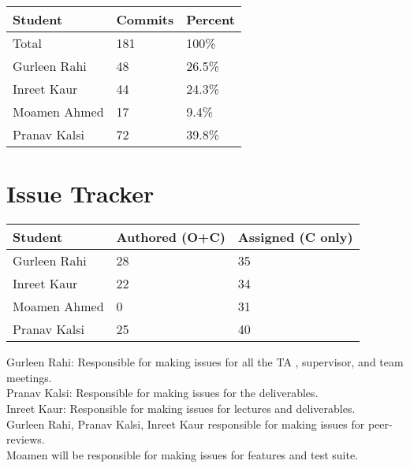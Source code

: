 \documentclass{article}
\begin{document}

\begin{table}[H]
\centering
\begin{tabular}{lll}
\toprule
\textbf{Student} & \textbf{Commits} & \textbf{Percent}\\
\midrule
Total & 181 & 100\% \\
Gurleen Rahi & 48 & 26.5\% \\
Inreet Kaur & 44 & 24.3\% \\
Moamen Ahmed & 17 & 9.4\% \\
Pranav Kalsi & 72 & 39.8\% \\
\bottomrule
\end{tabular}
\end{table}


\section{Issue Tracker}


\begin{table}[H]
\centering
\begin{tabular}{lll}
\toprule
\textbf{Student} & \textbf{Authored (O+C)} & \textbf{Assigned (C only)}\\
\midrule
Gurleen Rahi & 28 & 35\\
Inreet Kaur & 22 & 34\\
Moamen Ahmed & 0 & 31\\
Pranav Kalsi & 25 & 40\\
\bottomrule
\end{tabular}
\end{table}

Gurleen Rahi: Responsible for making issues for all the TA , supervisor,  and team meetings.\\
Pranav Kalsi: Responsible for making issues for the deliverables.\\
Inreet Kaur: Responsible for making issues for lectures and deliverables. \\
Gurleen Rahi, Pranav Kalsi, Inreet Kaur responsible for making issues for peer-reviews.\\
Moamen will be responsible for making issues for features and test suite.\\
\end{document}
